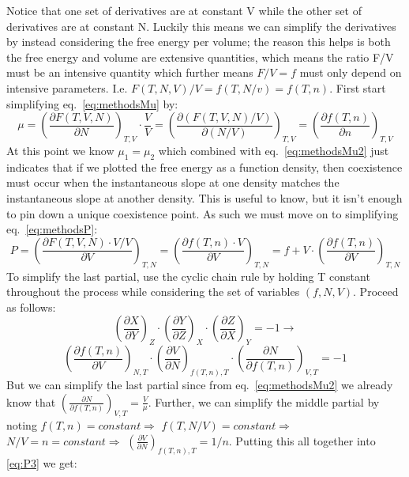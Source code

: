 Notice that one set of derivatives are at constant V while the other set of derivatives are at constant N. Luckily this means we can simplify the derivatives by instead considering the free energy per volume; the reason this helps is both the free energy and volume are extensive quantities, which means the ratio F/V must be an intensive quantity which further means $F/V=f$ must only depend on intensive parameters. I.e. $F(T,N,V)/V=f(T,N/v)=f(T,n)$. First start simplifying eq.~\ref{eq:methodsMu} by:
\begin{equation}\label{eq:methodsMu2}
\mu=\left(\frac{\partial F(T,V,N)}{\partial N}\right)_{T,V}\cdot\frac{V}{V}=\left(\frac{\partial (F(T,V,N)/V)}{\partial (N/V)}\right)_{T,V}=\left(\frac{\partial f(T,n)}{\partial n}\right)_{T,V}
\end{equation}
At this point we know $\mu_1=\mu_2$ which combined with eq.~\ref{eq:methodsMu2} just indicates that if we plotted the free energy as a function density, then coexistence must occur when the instantaneous slope at one density matches the instantaneous slope at another density. This is useful to know, but it isn't enough to pin down a unique coexistence point. As such we must move on to simplifying eq.~\ref{eq:methodsP}:
\begin{equation}\label{eq:methodsP2}
P=\left(\frac{\partial F(T,V,N)\cdot V/V}{\partial V}\right)_{T,N}=\left(\frac{\partial f(T,n)\cdot V}{\partial V}\right)_{T,N}=f+V\cdot\left(\frac{\partial f(T,n)}{\partial V}\right)_{T,N}
\end{equation}
To simplify the last partial, use the cyclic chain rule by holding T constant throughout the process while considering the set of variables $(f,N,V)$. Proceed as follows:
$$\left(\frac{\partial X}{\partial Y}\right)_Z\cdot \left(\frac{\partial Y}{\partial Z}\right)_X\cdot
\left(\frac{\partial Z}{\partial X}\right)_Y=-1 \rightarrow$$
\begin{equation}\label{eq:P3}
\left(\frac{\partial f(T,n)}{\partial V}\right)_{N,T} \cdot\left(\frac{\partial V}{\partial N}\right)_{f(T,n),T} \cdot\left(\frac{\partial N}{\partial f(T,n)}\right)_{V,T}=-1
\end{equation}
\sloppy But we can simplify the last partial since from eq.~\ref{eq:methodsMu2} we already know that $\left(\frac{\partial N}{\partial f(T,n)}\right)_{V,T}=\frac{V}{\mu}$. Further, we can simplify the middle partial by noting $f(T,n)=constant\Rightarrow$ $f(T,N/V)=constant \Rightarrow$ $N/V=n=constant \Rightarrow$ $\left(\frac{\partial V}{\partial N}\right)_{f(T,n),T}=1/n$. Putting this all together into \ref{eq:P3} we get:
